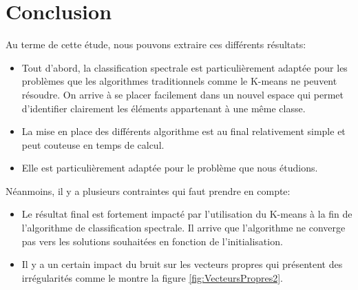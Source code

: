 \chapter*{Conclusion}

Au terme de cette étude, nous pouvons extraire ces différents résultats:

\begin{itemize}
\item Tout d'abord, la classification spectrale est particulièrement adaptée pour les problèmes que les algorithmes traditionnels comme le K-means ne peuvent résoudre. On arrive à se placer facilement dans un nouvel espace qui permet d'identifier clairement les éléments appartenant à une même classe.
\item La mise en place des différents algorithme est au final relativement simple et peut couteuse en temps de calcul.
\item Elle est particulièrement adaptée pour le problème que nous étudions.
\end{itemize}

\medskip

Néanmoins, il y a plusieurs contraintes qui faut prendre en compte:

\begin{itemize}
\item Le résultat final est fortement impacté par l'utilisation du K-means à la fin de l'algorithme de classification spectrale. Il arrive que l'algorithme ne converge pas vers les solutions souhaitées en fonction de l'initialisation.
\item Il y a un certain impact du bruit sur les vecteurs propres qui présentent des irrégularités comme le montre la figure \ref{fig:VecteursPropres2}.
\end{itemize}